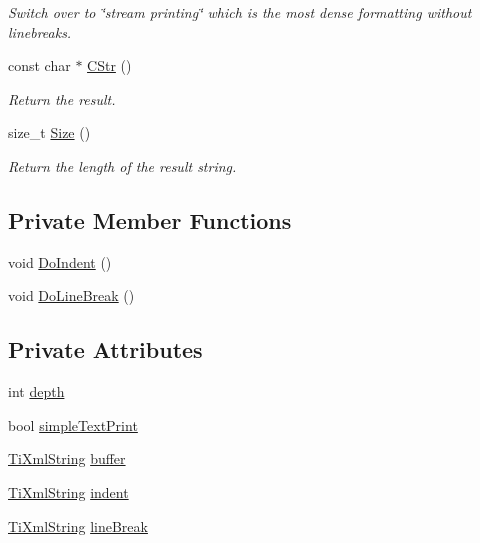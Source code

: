 \begin{DoxyCompactItemize}
\begin{DoxyCompactList}\small\item\em Switch over to \char`\"{}stream printing\char`\"{} which is the most dense formatting without linebreaks. \end{DoxyCompactList}\item 
const char $\ast$ \hyperlink{class_ti_xml_printer_a859eede9597d3e0355b77757be48735e}{CStr} ()
\begin{DoxyCompactList}\small\item\em Return the result. \end{DoxyCompactList}\item 
size\_\-t \hyperlink{class_ti_xml_printer_ad01375ae9199bd2f48252eaddce3039d}{Size} ()
\begin{DoxyCompactList}\small\item\em Return the length of the result string. \end{DoxyCompactList}\end{DoxyCompactItemize}
\subsection*{Private Member Functions}
\begin{DoxyCompactItemize}
\item 
void \hyperlink{class_ti_xml_printer_a348ad6527b1d43ddeb51454cddeb6a1d}{DoIndent} ()
\item 
void \hyperlink{class_ti_xml_printer_a252a0e13e06def9a06b2eb30a04677a0}{DoLineBreak} ()
\end{DoxyCompactItemize}
\subsection*{Private Attributes}
\begin{DoxyCompactItemize}
\item 
int \hyperlink{class_ti_xml_printer_a7e11330449daea912320c22f84387df7}{depth}
\item 
bool \hyperlink{class_ti_xml_printer_a2dceede5ae9bb8948f1ecaabb24ab2fb}{simpleTextPrint}
\item 
\hyperlink{class_ti_xml_string}{TiXmlString} \hyperlink{class_ti_xml_printer_a84854901a45ef7a6c93ed0ad6cf8fecd}{buffer}
\item 
\hyperlink{class_ti_xml_string}{TiXmlString} \hyperlink{class_ti_xml_printer_a356b8d2641b31176dcc6f96cd31e3bd6}{indent}
\item 
\hyperlink{class_ti_xml_string}{TiXmlString} \hyperlink{class_ti_xml_printer_ab2634608fe945f32e97473d45f012e2b}{lineBreak}
\end{DoxyCompactItemize}


